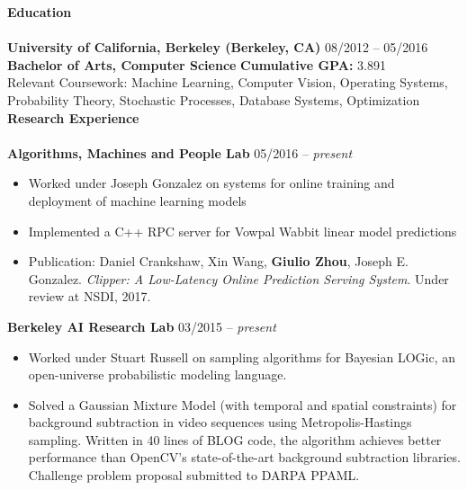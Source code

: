 \documentclass{article}
\begin{document}
\normalsize
\noindent
\textbf{{\Large Education}}\\[-2mm]
\HRule\\
\textbf{University of California, Berkeley (Berkeley, CA)}
\hfill 08/2012 -- 05/2016 \\
\indent
\textbf{Bachelor of Arts, Computer Science}  
\hfill{\textbf{Cumulative GPA: }3.891}\\
\indent
Relevant Coursework: Machine Learning, Computer Vision, Operating Systems, Probability Theory, Stochastic Processes, Database Systems, Optimization
\\[2mm]
\noindent
\textbf{{\Large Research Experience}}\\[-2mm]
\HRule\\
\noindent
\textbf{Algorithms, Machines and People Lab}
\hfill 05/2016 -- \textit{present}
\begin{itemize}
\vspace{-1.8mm}
\item Worked under Joseph Gonzalez on systems for online training and deployment of machine learning models
\vspace{-2.5mm}
\item Implemented a C++ RPC server for Vowpal Wabbit linear model predictions
\vspace{-2.5mm}
\item Publication: Daniel Crankshaw, Xin Wang, \textbf{Giulio Zhou}, Joseph E. Gonzalez. \textit{Clipper: A Low-Latency Online Prediction Serving System}. Under review at NSDI, 2017. 
\end{itemize}

\noindent
\textbf{Berkeley AI Research Lab}
\hfill 03/2015 -- \textit{present}
\begin{itemize}
\vspace{-1.8mm}
\item Worked under Stuart Russell on sampling algorithms for Bayesian LOGic, an open-universe probabilistic modeling language.
\vspace{-2.5mm}
\item Solved a Gaussian Mixture Model (with temporal and spatial constraints) for background subtraction in video sequences using Metropolis-Hastings sampling. Written in 40 lines of BLOG code, the algorithm achieves better performance than OpenCV's state-of-the-art background subtraction libraries. Challenge problem proposal submitted to DARPA PPAML.
\end{itemize}
\end{document}
